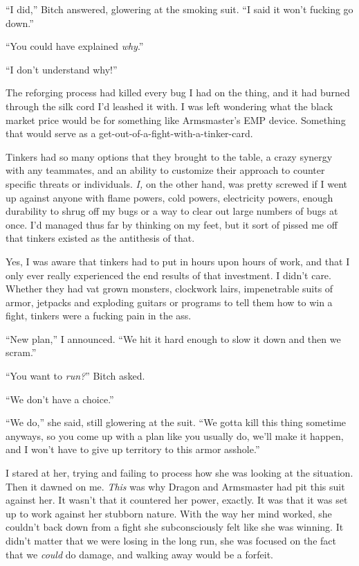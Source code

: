``I did,'' Bitch answered, glowering at the smoking suit.  ``I said it won't fucking go down.''



``You could have explained \emph{why}.''



``I don't understand why!''



The reforging process had killed every bug I had on the thing, and it had burned through the silk cord I'd leashed it with.  I was left wondering what the black market price would be for something like Armsmaster's EMP device.  Something that would serve as a get-out-of-a-fight-with-a-tinker-card.



Tinkers had so many options that they brought to the table, a crazy synergy with any teammates, and an ability to customize their approach to counter specific threats or individuals.  \emph{I,} on the other hand, was pretty screwed if I went up against anyone with flame powers, cold powers, electricity powers, enough durability to shrug off my bugs or a way to clear out large numbers of bugs at once.  I'd managed thus far by thinking on my feet, but it sort of pissed me off that tinkers existed as the antithesis of that.



Yes, I was aware that tinkers had to put in hours upon hours of work, and that I only ever really experienced the end results of that investment.  I didn't care.  Whether they had vat grown monsters, clockwork lairs, impenetrable suits of armor, jetpacks and exploding guitars or programs to tell them how to win a fight, tinkers were a fucking pain in the ass.



``New plan,'' I announced.  ``We hit it hard enough to slow it down and then we scram.''



``You want to \emph{run?}'' Bitch asked.



``We don't have a choice.''



``We do,'' she said, still glowering at the suit.  ``We gotta kill this thing sometime anyways, so you come up with a plan like you usually do, we'll make it happen, and I won't have to give up territory to this armor asshole.''



I stared at her, trying and failing to process how she was looking at the situation.  Then it dawned on me.  \emph{This} was why Dragon and Armsmaster had pit this suit against her.  It wasn't that it countered her power, exactly.  It was that it was set up to work against her stubborn nature.  With the way her mind worked, she couldn't back down from a fight she subconsciously felt like she was winning.  It didn't matter that we were losing in the long run, she was focused on the fact that we \emph{could} do damage, and walking away would be a forfeit.



